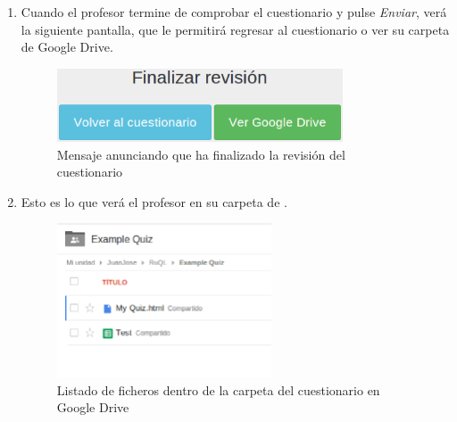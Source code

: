 \begin{enumerate}
  \item Cuando el profesor termine de comprobar el cuestionario y pulse \textit{Enviar}, ver\'a la siguiente pantalla, que le permitir\'a regresar al cuestionario o ver
  su carpeta de Google Drive.
  \begin{figure}[!th]
  \begin{center}
  \includegraphics[width=0.8\textwidth]{images/app9.eps}
  \caption{Mensaje anunciando que ha finalizado la revisi\'on del cuestionario}
  \label{fig:app9}
  \end{center}
  \end{figure}

  \item Esto es lo que ver\'a el profesor en su carpeta de .
  \begin{figure}[!th]
  \begin{center}
  \includegraphics[width=0.6\textwidth]{images/app10.eps}
  \caption{Listado de ficheros dentro de la carpeta del cuestionario en Google Drive}
  \label{fig:app10}
  \end{center}
  \end{figure}
  \newpage


\end{enumerate}
